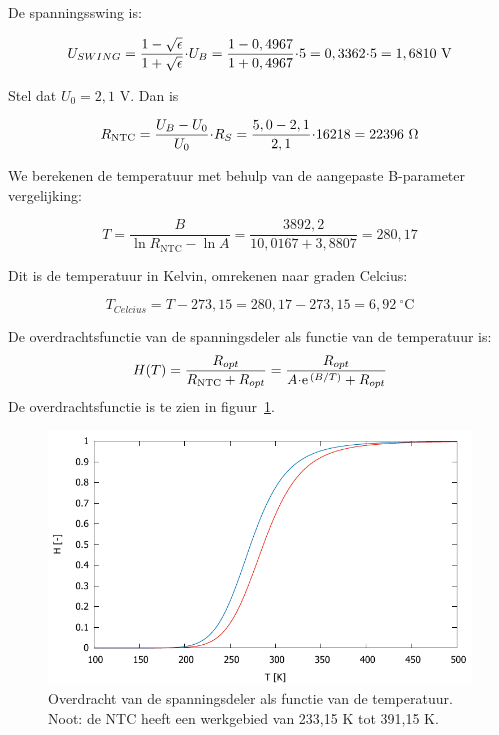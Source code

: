 \documentclass[12pt,a4paper,final,twoside,fleqn]{article}
\newcommand{\rntc}{R_\text{NTC}}
\newcommand{\ropt}{R_{opt}}
\let\oldcdot\cdot
\renewcommand{\cdot}{\kern-.10em\oldcdot\kern-.10em}
\begin{document}
De spanningsswing is:

\begin{equation}
U_{SWING} = \dfrac{1-\sqrt{\epsilon}}{1+\sqrt{\epsilon}}\cdot U_B
          = \dfrac{1-0,4967}{1+0,4967}\cdot 5 = 0,3362\cdot 5
          = 1,6810\ \text{V}
\end{equation}

Stel dat $U_0 = 2,1$ V. Dan is

\begin{equation}
\rntc = \dfrac{U_B-U_0}{U_0}\cdot R_S = \dfrac{5,0-2,1}{2,1}\cdot 16218 = 22396\ \Omega
\end{equation}

We berekenen de temperatuur met behulp van de aangepaste B-parameter vergelijking:

\begin{equation}
T = \dfrac{B}{\ln \rntc - \ln A} = \dfrac{3892,2}{10,0167+3,8807} = 280,17
\end{equation}

Dit is de temperatuur in Kelvin, omrekenen naar graden Celcius:

\begin{equation}
T_{Celcius} = T - 273,15 = 280,17 - 273,15 = 6,92\ ^\circ\text{C}
\end{equation}

De overdrachtsfunctie van de spanningsdeler als functie van de temperatuur is:
\begin{equation}
H(T) = \dfrac{\ropt}{\rntc + \ropt}=\dfrac{\ropt}{A\cdot\text{e}^{\,(B/T)}+\ropt}
\end{equation}
De overdrachtsfunctie is te zien in figuur~\ref{fig:transferfunctionz}.

\begin{figure}[ht!]
\centering
\includegraphics[scale=1]{gnuplot/transferfunctionz}
\caption[Overdracht van de spanningsdeler als functie van de temperatuur]{Overdracht van de spanningsdeler als functie van de temperatuur. Noot:
de NTC heeft een werkgebied van 233,15 K tot 391,15 K.}
\label{fig:transferfunctionz}
\end{figure}
\end{document}
